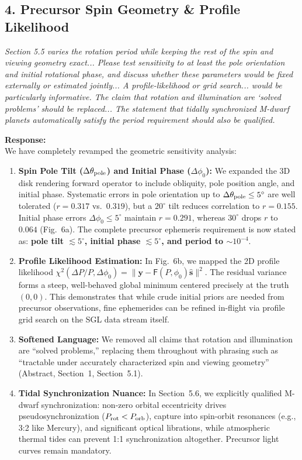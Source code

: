 \documentclass[11pt]{article}
\begin{document}
\subsection*{4. Precursor Spin Geometry \& Profile Likelihood}

\begin{refcomment}
\textit{Section 5.5 varies the rotation period while keeping the rest of the spin and viewing geometry exact... Please test sensitivity to at least the pole orientation and initial rotational phase, and discuss whether these parameters would be fixed externally or estimated jointly... A profile-likelihood or grid search... would be particularly informative. The claim that rotation and illumination are `solved problems' should be replaced... The statement that tidally synchronized M-dwarf planets automatically satisfy the period requirement should also be qualified.}
\end{refcomment}

\textbf{Response:}\\[1mm]
We have completely revamped the geometric sensitivity analysis:
\begin{enumerate}
\item \textbf{Spin Pole Tilt ($\Delta \theta_{\rm pole}$) and Initial Phase ($\Delta \phi_0$):} We expanded the 3D disk rendering forward operator to include obliquity, pole position angle, and initial phase. Systematic errors in pole orientation up to $\Delta\theta_{\rm pole} \le 5^\circ$ are well tolerated ($r=0.317$ vs.\ $0.319$), but a $20^\circ$ tilt reduces correlation to $r=0.155$. Initial phase errors $\Delta\phi_0 \le 5^\circ$ maintain $r=0.291$, whereas $30^\circ$ drops $r$ to $0.064$ (Fig.~6a). The complete precursor ephemeris requirement is now stated as: \textbf{pole tilt $\lesssim 5^\circ$, initial phase $\lesssim 5^\circ$, and period to $\sim 10^{-4}$}.
\item \textbf{Profile Likelihood Estimation:} In Fig.~6b, we mapped the 2D profile likelihood $\chi^2(\Delta P/P, \Delta\phi_0) = \|\mathbf{y} - \mathsf{F}(P, \phi_0)\hat{\mathbf{s}}\|^2$. The residual variance forms a steep, well-behaved global minimum centered precisely at the truth $(0, 0)$. This demonstrates that while crude initial priors are needed from precursor observations, fine ephemerides can be refined in-flight via profile grid search on the SGL data stream itself.
\item \textbf{Softened Language:} We removed all claims that rotation and illumination are ``solved problems,'' replacing them throughout with phrasing such as ``tractable under accurately characterized spin and viewing geometry'' (Abstract, Section~1, Section~5.1).
\item \textbf{Tidal Synchronization Nuance:} In Section~5.6, we explicitly qualified M-dwarf synchronization: non-zero orbital eccentricity drives pseudosynchronization ($P_{\rm rot} < P_{\rm orb}$), capture into spin-orbit resonances (e.g., 3:2 like Mercury), and significant optical librations, while atmospheric thermal tides can prevent 1:1 synchronization altogether. Precursor light curves remain mandatory.
\end{enumerate}
\end{document}
